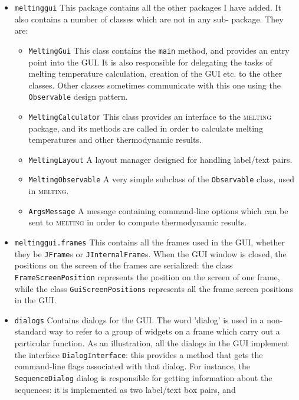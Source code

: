 \documentclass{article}
\begin{document}
\begin{itemize}
  \item \texttt{meltinggui} This package contains all the other packages I have
  added.  It also contains a number of classes which are not in any sub-
  package.
  They are: 
  \begin{itemize}
    \item \texttt{MeltingGui} This class contains the \texttt{main} method, and
    provides an entry point into the GUI.  It is also responsible for 
    delegating the tasks of melting temperature calculation, creation of the
    GUI etc. to the other classes.  Other classes sometimes communicate with
    this one using the \texttt{Observable} design pattern.
    \item \texttt{MeltingCalculator} This class provides an interface to the 
    \textsc{melting} package, and its methods are called in order to calculate
    melting temperatures and other thermodynamic results.
    \item \texttt{MeltingLayout} A layout manager designed for handling
    label/text pairs.  
    \item \texttt{MeltingObservable} A very simple subclass of the 
    \texttt{Observable} class, used in \textsc{melting}.  
    \item \texttt{ArgsMessage} A message containing command-line options which
    can be sent to \textsc{melting} in order to compute thermodynamic results.
  \end{itemize}
  \item \texttt{meltinggui.frames} This contains all the frames used in the
  GUI, whether they be \texttt{JFrame}s or \texttt{JInternalFrame}s.  When the
  GUI window is closed, the positions on the screen of the frames are 
  serialized: the class \texttt{FrameScreenPosition} represents the position on
  the screen of one frame, while the class \texttt{GuiScreenPositions} 
  represents all the frame screen positions in the GUI.  
  \item \texttt{dialogs} Contains dialogs for the GUI.  The word 'dialog' is 
  used in a non-standard way to refer to a group of widgets on a frame which 
  carry out a particular function.  As an illustration, all the dialogs in the
  GUI implement the interface \texttt{DialogInterface}: this provides a method
  that gets the command-line flags associated with that dialog.  For instance,
  the \texttt{SequenceDialog} dialog is responsible for getting information 
  about the sequences: it is implemented as two label/text box pairs, and 

\end{itemize}
\end{document}
